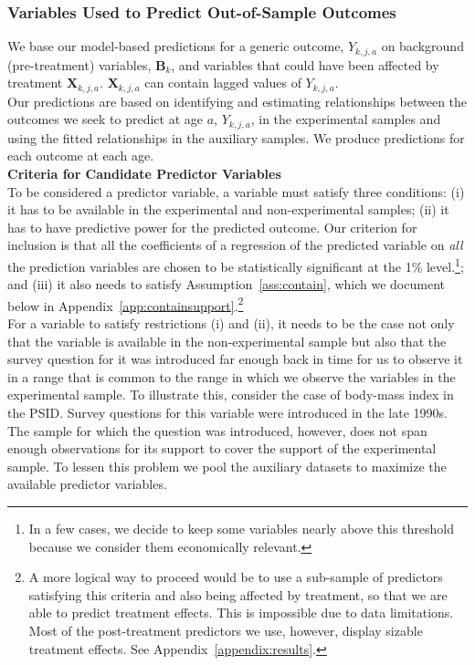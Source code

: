 \subsubsection{Variables Used to Predict Out-of-Sample Outcomes} \label{appendix:pred}

We base our model-based predictions for a generic outcome, $Y_{k,j,a}$ on background (pre-treatment) variables, $\bm{B}_k$, and variables that could have been affected by treatment $\bm{X}_{k,j,a}$. $\bm{X}_{k,j,a}$ can contain lagged values of $Y_{k,j,a}$.\\

\noindent Our predictions are based on identifying and estimating relationships between the outcomes we seek to predict at age $a$, $Y_{k,j,a}$, in the experimental samples and using the fitted relationships in the auxiliary samples. We produce predictions for each outcome at each age.\\

\noindent \textbf{Criteria for Candidate Predictor Variables}\\
\noindent To be considered a predictor variable, a variable must satisfy three conditions: (i) it has to be available in the experimental and non-experimental samples; (ii) it has to have predictive power for the predicted outcome. Our criterion for inclusion is that all the coefficients of a regression of the predicted variable on \textit{all} the prediction variables are chosen to be statistically significant at the 1\% level.\footnote{In a few cases, we decide to keep some variables nearly above this threshold because we consider them economically relevant.}; and (iii) it also needs to satisfy Assumption~\ref{ass:contain}, which we document below in Appendix~\ref{app:containsupport}.\footnote{A more logical way to proceed would be to use a sub-sample of predictors satisfying this criteria and also being affected by treatment, so that we are able to predict treatment effects. This is impossible due to data limitations. Most of the post-treatment predictors we use, however, display sizable treatment effects. See Appendix~\ref{appendix:results}.}\\

\noindent For a variable to satisfy restrictions (i) and (ii), it needs to be the case not only that the variable is available in the non-experimental sample but also that the survey question for it was introduced far enough back in time for us to observe it in a range that is common to the range in which we observe the variables in the experimental sample. To illustrate this, consider the case of body-mass index in the PSID. Survey questions for this variable were introduced in the late 1990s. The sample for which the question was introduced, however, does not span enough observations for its support to cover the support of the experimental sample. To lessen this problem we pool the auxiliary datasets to maximize the available predictor variables.\\

